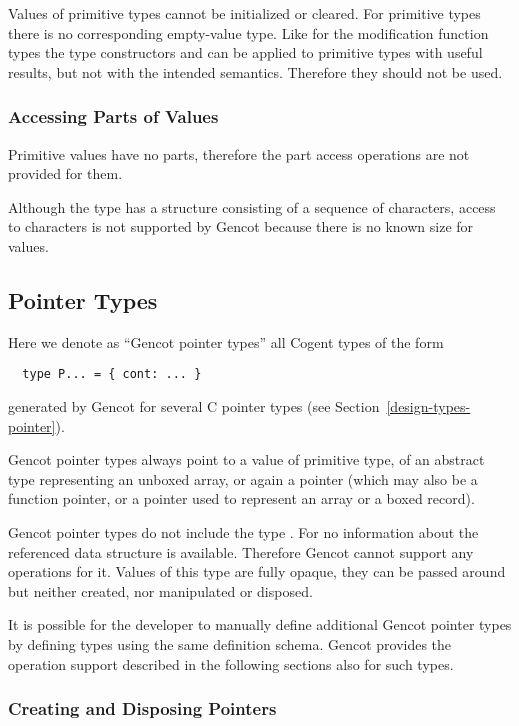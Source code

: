 Values of primitive types cannot be initialized or cleared. For primitive types there is no corresponding empty-value type.
Like for the modification function types the type constructors
 and  can be applied to primitive types with useful results, but not with the intended semantics.
Therefore they should not be used.

\subsubsection{Accessing Parts of Values}

Primitive values have no parts, therefore the part access operations are not provided for them.

Although the type  has a structure consisting of a sequence of characters, access to characters is not supported
by Gencot because there is no known size for  values.

\subsection{Pointer Types}
\label{design-operations-pointer}

Here we denote as ``Gencot pointer types'' all Cogent types of the form 
\begin{verbatim}
  type P... = { cont: ... }
\end{verbatim}
generated by Gencot for several C pointer types (see Section~\ref{design-types-pointer}).

Gencot pointer types always point to a value of primitive type, of an abstract type representing an unboxed array, or again a pointer 
(which may also be a function pointer, or a pointer used to represent an array or a boxed record).

Gencot pointer types do not include the type . For  no information about the referenced data structure is available. 
Therefore Gencot cannot support any operations 
for it. Values of this type are fully opaque, they can be passed around but neither created, nor manipulated or disposed. 

It is possible for the developer to manually define additional Gencot pointer types by defining types using the same definition schema.
Gencot provides the operation support described in the following sections also for such types.

\subsubsection{Creating and Disposing Pointers}

